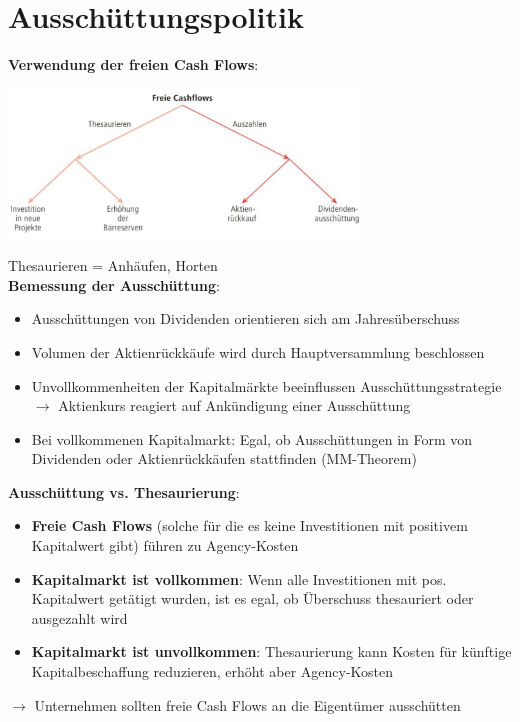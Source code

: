 \pagebreak
\section{Ausschüttungspolitik}

\textbf{Verwendung der freien Cash Flows}:
\begin{center}
	\includegraphics[width=0.7\textwidth]{images/fc.png}
\end{center}
Thesaurieren = Anhäufen, Horten\\

\textbf{Bemessung der Ausschüttung}:
\begin{itemize}
	\item Ausschüttungen von Dividenden orientieren sich am Jahresüberschuss
	\item Volumen der Aktienrückkäufe wird durch Hauptversammlung beschlossen
	\item Unvollkommenheiten der Kapitalmärkte beeinflussen Ausschüttungsstrategie $\rightarrow$ Aktienkurs reagiert auf Ankündigung einer Ausschüttung
	\item Bei vollkommenen Kapitalmarkt: Egal, ob Ausschüttungen in Form von Dividenden oder Aktienrückkäufen stattfinden (MM-Theorem)
\end{itemize}
\bigskip
\textbf{Ausschüttung vs. Thesaurierung}:
\begin{itemize}
	\item \textbf{Freie Cash Flows} (solche für die es keine Investitionen mit positivem Kapitalwert gibt) führen zu Agency-Kosten
	\item \textbf{Kapitalmarkt ist vollkommen}: Wenn alle Investitionen mit pos. Kapitalwert getätigt wurden, ist es egal, ob Überschuss thesauriert oder ausgezahlt wird
	\item \textbf{Kapitalmarkt ist unvollkommen}: Thesaurierung kann Kosten für künftige Kapitalbeschaffung reduzieren, erhöht aber Agency-Kosten
\end{itemize}
$\rightarrow$ Unternehmen sollten freie Cash Flows an die Eigentümer ausschütten\\

